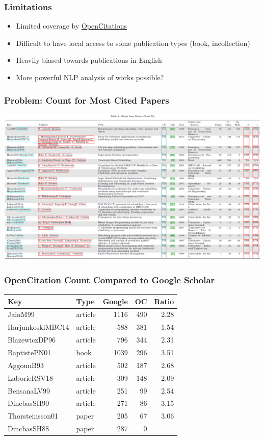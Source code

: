 \begin{frame}
\frametitle{Limitations}
\begin{itemize}
\item Limited coverage by \href{https://opencitations.net/}{OpenCitations}
\item Difficult to have local access to some publication types (book, incollection)
\item Heavily biased towards publications in English
\item More powerful NLP analysis of works possible?
\end{itemize}
\end{frame}

\begin{frame}
\frametitle{Problem: Count for Most Cited Papers}
\includegraphics[width=\textwidth]{survey/mostcited}
\end{frame} 

\begin{frame}
\frametitle{OpenCitation Count Compared to Google Scholar}
\begin{tabular}{llrrr}\toprule
Key & Type & Google & OC & Ratio \\ \midrule
JainM99          & article & 1116 & 490 & 2.28\\
HarjunkoskiMBC14 & article &  588 & 381 & 1.54\\
BlazewiczDP96    & article &  796 & 344 & 2.31\\
BaptistePN01     & book    & 1039 & 296 & 3.51\\
AggounB93        & article &  502 & 187 & 2.68\\
LaborieRSV18     & article &  309 & 148 & 2.09\\
BensanaLV99      & article &  251 &  99 & 2.54\\
DincbasSH90      & article &  271 &  86 & 3.15\\
Thorsteinsson01  & paper   &  205 &  67 & 3.06\\
\midrule
DincbasSH88      & paper   &  287 &   0 & \frownie{}\\
\bottomrule
\end{tabular}
\end{frame}
 


